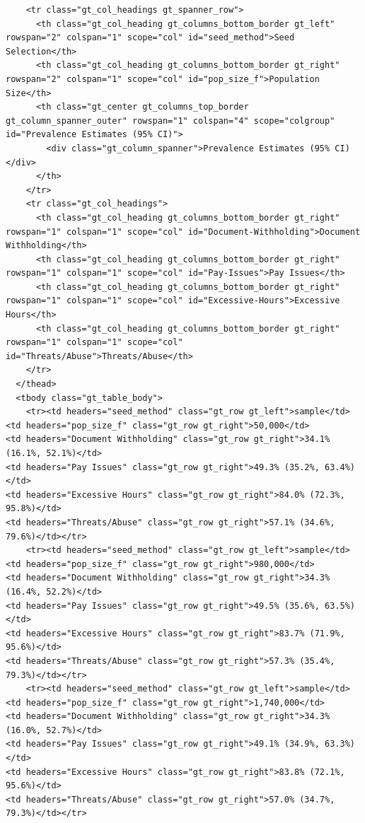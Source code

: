 \documentclass[
  12pt,
  letterpaper,
  DIV=11,
  numbers=noendperiod]{scrartcl}
\theoremstyle{plain}
\theoremstyle{definition}
\begin{document}
\begin{table}
{\begin{verbatim}
    <tr class="gt_col_headings gt_spanner_row">
      <th class="gt_col_heading gt_columns_bottom_border gt_left" rowspan="2" colspan="1" scope="col" id="seed_method">Seed Selection</th>
      <th class="gt_col_heading gt_columns_bottom_border gt_right" rowspan="2" colspan="1" scope="col" id="pop_size_f">Population Size</th>
      <th class="gt_center gt_columns_top_border gt_column_spanner_outer" rowspan="1" colspan="4" scope="colgroup" id="Prevalence Estimates (95% CI)">
        <div class="gt_column_spanner">Prevalence Estimates (95% CI)</div>
      </th>
    </tr>
    <tr class="gt_col_headings">
      <th class="gt_col_heading gt_columns_bottom_border gt_right" rowspan="1" colspan="1" scope="col" id="Document-Withholding">Document Withholding</th>
      <th class="gt_col_heading gt_columns_bottom_border gt_right" rowspan="1" colspan="1" scope="col" id="Pay-Issues">Pay Issues</th>
      <th class="gt_col_heading gt_columns_bottom_border gt_right" rowspan="1" colspan="1" scope="col" id="Excessive-Hours">Excessive Hours</th>
      <th class="gt_col_heading gt_columns_bottom_border gt_right" rowspan="1" colspan="1" scope="col" id="Threats/Abuse">Threats/Abuse</th>
    </tr>
  </thead>
  <tbody class="gt_table_body">
    <tr><td headers="seed_method" class="gt_row gt_left">sample</td>
<td headers="pop_size_f" class="gt_row gt_right">50,000</td>
<td headers="Document Withholding" class="gt_row gt_right">34.1% (16.1%, 52.1%)</td>
<td headers="Pay Issues" class="gt_row gt_right">49.3% (35.2%, 63.4%)</td>
<td headers="Excessive Hours" class="gt_row gt_right">84.0% (72.3%, 95.8%)</td>
<td headers="Threats/Abuse" class="gt_row gt_right">57.1% (34.6%, 79.6%)</td></tr>
    <tr><td headers="seed_method" class="gt_row gt_left">sample</td>
<td headers="pop_size_f" class="gt_row gt_right">980,000</td>
<td headers="Document Withholding" class="gt_row gt_right">34.3% (16.4%, 52.2%)</td>
<td headers="Pay Issues" class="gt_row gt_right">49.5% (35.6%, 63.5%)</td>
<td headers="Excessive Hours" class="gt_row gt_right">83.7% (71.9%, 95.6%)</td>
<td headers="Threats/Abuse" class="gt_row gt_right">57.3% (35.4%, 79.3%)</td></tr>
    <tr><td headers="seed_method" class="gt_row gt_left">sample</td>
<td headers="pop_size_f" class="gt_row gt_right">1,740,000</td>
<td headers="Document Withholding" class="gt_row gt_right">34.3% (16.0%, 52.7%)</td>
<td headers="Pay Issues" class="gt_row gt_right">49.1% (34.9%, 63.3%)</td>
<td headers="Excessive Hours" class="gt_row gt_right">83.8% (72.1%, 95.6%)</td>
<td headers="Threats/Abuse" class="gt_row gt_right">57.0% (34.7%, 79.3%)</td></tr>

\end{verbatim}}
\end{table}
\end{document}
